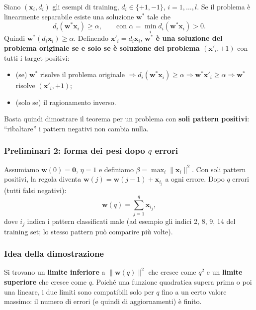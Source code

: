 Siano \((\mathbf{x}_i, d_i)\) gli esempi di training,
\(d_i \in \{+1, -1\}\), \(i = 1,\dots,l\). Se il problema è linearmente
separabile esiste una soluzione \(\mathbf{w}^*\) tale che \[
d_i(\mathbf{w}^*\mathbf{x}_i) \ge \alpha, \qquad \text{con } \alpha = \min_i d_i(\mathbf{w}^*\mathbf{x}_i) > 0.
\] Quindi \(\mathbf{w}^*(d_i\mathbf{x}_i) \ge \alpha\). Definendo
\(\mathbf{x}'_i = d_i\mathbf{x}_i\), \textbf{\(\mathbf{w}^*\) è una
soluzione del problema originale se e solo se è soluzione del problema
\((\mathbf{x}'_i, +1)\)} con tutti i target positivi:

\begin{itemize}
\tightlist
\item
  (se) \(\mathbf{w}^*\) risolve il problema originale
  \(\Rightarrow d_i(\mathbf{w}^*\mathbf{x}_i) \ge \alpha \Rightarrow \mathbf{w}^*\mathbf{x}'_i \ge \alpha \Rightarrow \mathbf{w}^*\)
  risolve \((\mathbf{x}'_i, +1)\);
\item
  (solo se) il ragionamento inverso.
\end{itemize}

Basta quindi dimostrare il teorema per un problema con \textbf{soli
pattern positivi}: ``ribaltare'' i pattern negativi non cambia nulla.

\subsubsection{\texorpdfstring{Preliminari 2: forma dei pesi dopo \(q\)
errori}{Preliminari 2: forma dei pesi dopo q errori}}\label{preliminari-2-forma-dei-pesi-dopo-q-errori}

Assumiamo \(\mathbf{w}(0) = \mathbf{0}\), \(\eta = 1\) e definiamo
\(\beta = \max_i \|\mathbf{x}_i\|^2\). Con soli pattern positivi, la
regola diventa \(\mathbf{w}(j) = \mathbf{w}(j-1) + \mathbf{x}_{i_j}\) a
ogni errore. Dopo \(q\) errori (tutti falsi negativi): \[
\mathbf{w}(q) = \sum_{j=1}^{q} \mathbf{x}_{i_j},
\] dove \(i_j\) indica i pattern classificati male (ad esempio gli
indici 2, 8, 9, 14 del training set; lo stesso pattern può comparire più
volte).

\subsubsection{Idea della dimostrazione}\label{idea-della-dimostrazione}

Si trovano un \textbf{limite inferiore} a \(\|\mathbf{w}(q)\|^2\) che
cresce come \(q^2\) e un \textbf{limite superiore} che cresce come
\(q\). Poiché una funzione quadratica supera prima o poi una lineare, i
due limiti sono compatibili solo per \(q\) fino a un certo valore
massimo: il numero di errori (e quindi di aggiornamenti) è finito.

